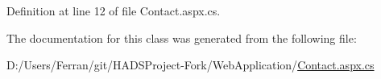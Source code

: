 Definition at line 12 of file Contact.\+aspx.\+cs.



The documentation for this class was generated from the following file\+:\begin{DoxyCompactItemize}
\item 
D\+:/\+Users/\+Ferran/git/\+H\+A\+D\+S\+Project-\/\+Fork/\+Web\+Application/\mbox{\hyperlink{Contact_8aspx_8cs}{Contact.\+aspx.\+cs}}\end{DoxyCompactItemize}
